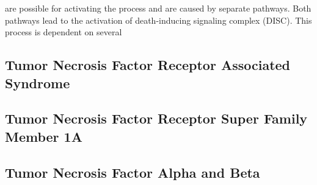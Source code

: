 %
%
%
%
%


 are possible for activating the process and are caused by separate pathways. 
Both pathways lead to the activation of death-inducing signaling complex (DISC). This process is dependent on several 
\subsection{Tumor Necrosis Factor Receptor Associated Syndrome}
\label{subsec:CD_TRAPS}

\subsection{Tumor Necrosis Factor Receptor Super Family Member 1A}
\label{subsec:CD_TNFRSF1A}

\subsection{Tumor Necrosis Factor Alpha and Beta}
\label{subsec:CD_TNF_A_B}